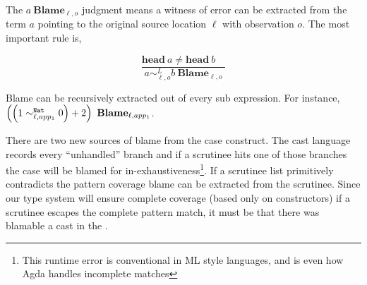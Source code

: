 The $a\ \mathbf{Blame}_{\ell,o}$ judgment means a witness of error can be extracted from the term $a$ pointing to the original source location $\ell$ with observation $o$.
The most important rule is,

\[
\frac{\mathbf{head}\ a\neq\mathbf{head}\ b\quad}{a\sim_{\ell,o}^{L}b\ \mathbf{Blame}_{\ell,o}}
\]

Blame can be recursively extracted out of every sub expression.
For instance, $\left(\left(1\sim_{\ell,app_{1}}^{\mathtt{Nat}{} }0\right)+2\right)\ \mathbf{Blame}_{\ell,app_{1}}$.

There are two new sources of blame from the case construct.
The cast language records every ``unhandled'' branch and if a scrutinee hits one of those branches the case will be blamed for in-exhaustiveness\footnote{
  This runtime error is conventional in ML style languages, and is even
how Agda handles incomplete matches }.
If a scrutinee list primitively contradicts the pattern coverage blame can be extracted from the scrutinee. 
Since our type system will ensure complete coverage (based only on constructors) if a scrutinee escapes the complete pattern match, it must be that there was blamable a cast in the \scrut.






